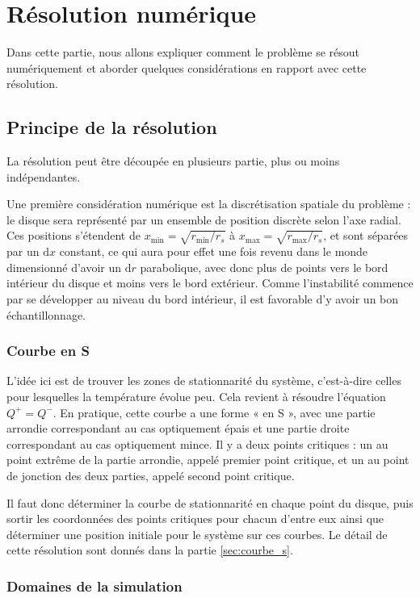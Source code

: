\section{Résolution numérique}

Dans cette partie, nous allons expliquer comment le problème se résout
numériquement et aborder quelques considérations en rapport avec cette
résolution.

\subsection{Principe de la résolution}
La résolution peut être découpée en plusieurs partie, plus ou moins
indépendantes.

Une première considération numérique est la discrétisation spatiale du problème
: le disque sera représenté par un ensemble de position discrète selon l’axe
radial. Ces positions s’étendent de $x_\textrm{min} = \sqrt{r_\textrm{min}/r_s}$ à $x_\textrm{max} =
\sqrt{r_\textrm{max}/r_s}$, et sont séparées par un $\mathrm{d} x$ constant, ce qui aura pour
effet une fois revenu dans le monde dimensionné d’avoir un $\mathrm{d} r$ parabolique,
avec donc plus de points vers le bord intérieur du disque et moins vers le bord
extérieur. Comme l'instabilité commence par se développer au niveau du bord intérieur, il est favorable d'y avoir un bon échantillonnage.

\subsubsection{Courbe en S}

L’idée ici est de trouver les zones de stationnarité du système, c’est-à-dire
celles pour lesquelles la température évolue peu. Cela revient à résoudre
l’équation $Q^+ = Q^-$. En pratique, cette courbe a une forme « en S », avec
une partie arrondie correspondant au cas optiquement épais et une partie droite
correspondant au cas optiquement mince. Il y a deux points critiques : un au
point extrême de la partie arrondie, appelé premier point critique, et un au
point de jonction des deux parties, appelé second point critique.

Il faut donc déterminer la courbe de stationnarité en chaque point du disque,
puis sortir les coordonnées des points critiques pour chacun d’entre eux ainsi
que déterminer une position initiale pour le système sur ces courbes. Le détail de 
cette résolution sont donnés dans la partie \ref{sec:courbe_s}.

\subsubsection{Domaines de la simulation}

